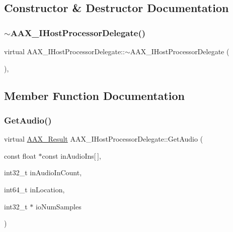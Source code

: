 \subsection{Constructor \& Destructor Documentation}
\mbox{\label{a01837_ad3a419f006b4a5dda335d5c3aa0f8d9f}} 
\subsubsection{\texorpdfstring{$\sim$AAX\_IHostProcessorDelegate()}{~AAX\_IHostProcessorDelegate()}}
{\footnotesize\ttfamily virtual A\+A\+X\+\_\+\+I\+Host\+Processor\+Delegate\+::$\sim$\+A\+A\+X\+\_\+\+I\+Host\+Processor\+Delegate (\begin{DoxyParamCaption}{ }\end{DoxyParamCaption})\hspace{0.3cm}{\ttfamily [inline]}, {\ttfamily [virtual]}}



\subsection{Member Function Documentation}
\mbox{\label{a01837_ae083d877253163dd367f46c7c491e9e3}} 
\subsubsection{\texorpdfstring{GetAudio()}{GetAudio()}}
{\footnotesize\ttfamily virtual \mbox{\hyperlink{a00392_a4d8f69a697df7f70c3a8e9b8ee130d2f}{A\+A\+X\+\_\+\+Result}} A\+A\+X\+\_\+\+I\+Host\+Processor\+Delegate\+::\+Get\+Audio (\begin{DoxyParamCaption}\item[{const float $\ast$const}]{in\+Audio\+Ins\mbox{[}$\,$\mbox{]},  }\item[{int32\+\_\+t}]{in\+Audio\+In\+Count,  }\item[{int64\+\_\+t}]{in\+Location,  }\item[{int32\+\_\+t $\ast$}]{io\+Num\+Samples }\end{DoxyParamCaption})\hspace{0.3cm}{\ttfamily [pure virtual]}}



